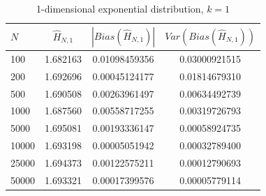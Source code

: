 \documentclass{report}
\begin{document}
\begin{table}
\caption{1-dimensional exponential distribution, $k=1$} \label{expo_k=1_table}
\begin{center}
\begin{tabular}{| l | c c c|} 
\toprule
$N$ & $\hat{H}_{N, 1}$ & $|Bias(\hat{H}_{N, 1})|$ & $Var(Bias(\hat{H}_{N, 1}))$ \\
\midrule[1pt]
100     & 1.682163     & 0.01098459356     & 0.03000921515  \\
200     & 1.692696     & 0.00045124177     & 0.01814679310  \\
500     & 1.690508     & 0.00263961497     & 0.00634492739  \\
1000    & 1.687560     & 0.00558717255     & 0.00319726793  \\
5000    & 1.695081     & 0.00193336147     & 0.00058924735  \\
10000   & 1.693198     & 0.00005051942     & 0.00032789400  \\
25000   & 1.694373     & 0.00122575211     & 0.00012790693  \\
50000   & 1.693321     & 0.00017399576     & 0.00005779114  \\
\hline
\end{tabular}
\end{center}
\end{table}
\end{document}
